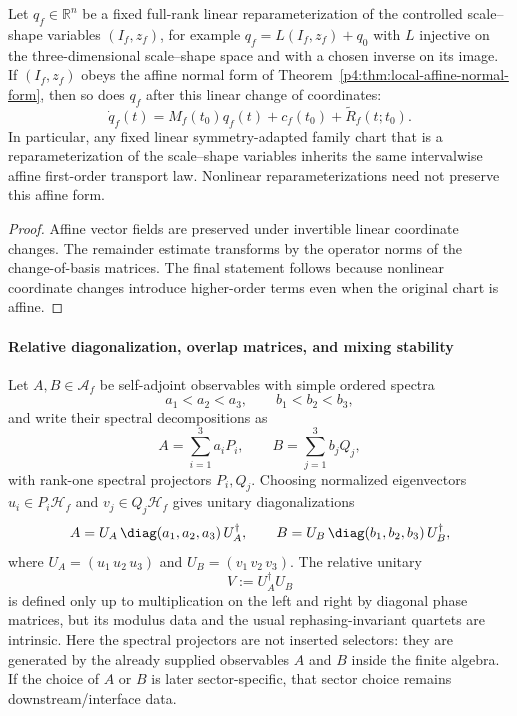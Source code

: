 \documentclass[12pt,a4paper]{article}
\begin{document}
\begin{corollary}
\label{p4:cor:chart-transfer-affine}
Let $q_f\in\mathbb R^n$ be a fixed full-rank linear reparameterization of the controlled scale--shape variables $(I_f,z_f)$, for example $q_f=L(I_f,z_f)+q_0$ with $L$ injective on the three-dimensional scale--shape space and with a chosen inverse on its image.
If $(I_f,z_f)$ obeys the affine normal form of Theorem~\ref{p4:thm:local-affine-normal-form}, then so does $q_f$ after this linear change of coordinates:
\begin{equation}
\label{p4:eq:chart-transfer-affine}
\dot q_f(t)=M_f(t_0)q_f(t)+c_f(t_0)+\widetilde R_f(t;t_0).
\end{equation}
In particular, any fixed linear symmetry-adapted family chart that is a reparameterization of the scale--shape variables inherits the same intervalwise affine first-order transport law.
Nonlinear reparameterizations need not preserve this affine form.
\end{corollary}

\begin{proof}
Affine vector fields are preserved under invertible linear coordinate changes.
The remainder estimate transforms by the operator norms of the change-of-basis matrices.
The final statement follows because nonlinear coordinate changes introduce higher-order terms even when the original chart is affine.
\end{proof}



\paragraph{Relative diagonalization, overlap matrices, and mixing stability}
\label{p4:sec:part2-threelevel-mixing}

Let $A,B\in\mathcal A_f$ be self-adjoint observables with simple ordered spectra
\[
a_1<a_2<a_3,
\qquad
b_1<b_2<b_3,
\]
and write their spectral decompositions as
\[
A=\sum_{i=1}^3 a_i P_i,
\qquad
B=\sum_{j=1}^3 b_j Q_j,
\]
with rank-one spectral projectors $P_i,Q_j$.
Choosing normalized eigenvectors $u_i\in P_i\mathcal H_f$ and $v_j\in Q_j\mathcal H_f$ gives unitary diagonalizations
\[
A=U_A\,\diag(a_1,a_2,a_3)\,U_A^\dagger,
\qquad
B=U_B\,\diag(b_1,b_2,b_3)\,U_B^\dagger,
\]
where $U_A=(u_1\,u_2\,u_3)$ and $U_B=(v_1\,v_2\,v_3)$.
The relative unitary
\[
V:=U_A^\dagger U_B
\]
is defined only up to multiplication on the left and right by diagonal phase matrices, but its modulus data and the usual rephasing-invariant quartets are intrinsic.
Here the spectral projectors are not inserted selectors: they are generated by the already supplied observables \(A\) and \(B\) inside the finite algebra.  If the choice of \(A\) or \(B\) is later sector-specific, that sector choice remains downstream/interface data.
\end{document}
